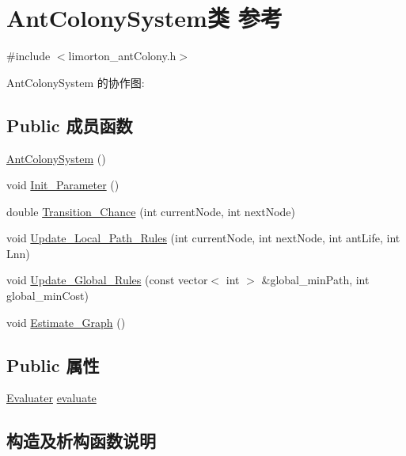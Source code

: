 \hypertarget{class_ant_colony_system}{}\section{Ant\+Colony\+System类 参考}
\label{class_ant_colony_system}


{\ttfamily \#include $<$limorton\+\_\+ant\+Colony.\+h$>$}



Ant\+Colony\+System 的协作图\+:
\subsection*{Public 成员函数}
\begin{DoxyCompactItemize}
\item 
\hyperlink{class_ant_colony_system_acf72f4454119e265be31138b2b2d626a}{Ant\+Colony\+System} ()
\item 
void \hyperlink{class_ant_colony_system_a999349b4ad5d3d0bdf6d4b033482c941}{Init\+\_\+\+Parameter} ()
\item 
double \hyperlink{class_ant_colony_system_a4075c8d1df3c93da49d15996a00f9b27}{Transition\+\_\+\+Chance} (int current\+Node, int next\+Node)
\item 
void \hyperlink{class_ant_colony_system_ab0c9ef616e5754c3d9a4b3f18758c29d}{Update\+\_\+\+Local\+\_\+\+Path\+\_\+\+Rules} (int current\+Node, int next\+Node, int ant\+Life, int Lnn)
\item 
void \hyperlink{class_ant_colony_system_a0131a66f37712412b646f6a960c99e50}{Update\+\_\+\+Global\+\_\+\+Rules} (const vector$<$ int $>$ \&global\+\_\+min\+Path, int global\+\_\+min\+Cost)
\item 
void \hyperlink{class_ant_colony_system_acf653737ac9309168903332e38ea25f8}{Estimate\+\_\+\+Graph} ()
\end{DoxyCompactItemize}
\subsection*{Public 属性}
\begin{DoxyCompactItemize}
\item 
\hyperlink{struct_evaluater}{Evaluater} \hyperlink{class_ant_colony_system_a9445ee19c15eb281300ea0476733edac}{evaluate}
\end{DoxyCompactItemize}


\subsection{构造及析构函数说明}
\mbox{\label{class_ant_colony_system_acf72f4454119e265be31138b2b2d626a}} 
